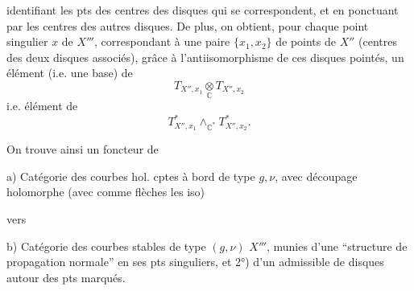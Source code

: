 identifiant les pts des centres des disques
qui se correspondent, et en ponctuant
par les centres des autres disques.
De plus, on obtient,  pour chaque
point singulier $x$ de $X'''$, correspondant
à une paire $\{x_1,x_2\}$ de points de
$X''$ (centres des deux disques associés),
grâce à l'antiisomorphisme de ces
disques pointés, un élément   (i.e. une base)
de
\[
T_{X'',x_1}\underset{\mathbb C}{\otimes}T_{X'',x_2}
\]
i.e.  élément de
\[
T_{X'',x_1}^{*}\mathbin{\wedge}_{\mathbb C^*}T_{X'',x_2}^{*}.
\]

On trouve ainsi un foncteur de

a) Catégorie  des courbes hol. cptes à bord  de
type $g,\nu$, avec découpage holomorphe
(avec comme flèches les iso)

vers

b) Catégorie des courbes  stables de type $(g,\nu)$
$X'''$, munies  d'une ``structure de propagation
normale'' en ses pts singuliers, et 2°) d'un
  admissible de
disques autour des pts marqués.
